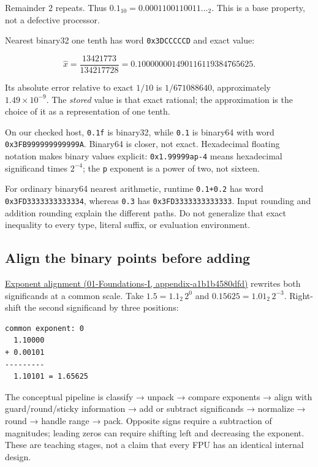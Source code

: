 Remainder 2 repeats. Thus \(0.1_{10}=0.0001100110011\ldots_2\). This is a base property, not a defective processor.

Nearest binary32 one tenth has word \texttt{0x3DCCCCCD} and exact value:

\[
\widehat{x}=\frac{13421773}{134217728}
=0.100000001490116119384765625.
\]

Its absolute error relative to exact \(1/10\) is \(1/671088640\), approximately \(1.49\times10^{-9}\). The \emph{stored} value is that exact rational; the approximation is the choice of it as a representation of one tenth.

On our checked host, \texttt{0.1f} is binary32, while \texttt{0.1} is binary64 with word \texttt{0x3FB999999999999A}. Binary64 is closer, not exact. Hexadecimal floating notation makes binary values explicit: \texttt{0x1.99999ap-4} means hexadecimal significand times \(2^{-4}\); the \texttt{p} exponent is a power of two, not sixteen.

For ordinary binary64 nearest arithmetic, runtime \texttt{0.1+0.2} has word \texttt{0x3FD3333333333334}, whereas \texttt{0.3} has \texttt{0x3FD3333333333333}. Input rounding and addition rounding explain the different paths. Do not generalize that exact inequality to every type, literal suffix, or evaluation environment.

\subsection{Align the binary points before adding}\label{05-engine-i-ch001-align-the-binary-points-before-adding}

\href{../01-Foundations-I/main.pdf\#nameddest=appendix-a1b1b4580dfd}{Exponent alignment (01-Foundations-I, appendix-a1b1b4580dfd)} rewrites both significands at a common scale. Take \(1.5=1.1_2\,2^0\) and \(0.15625=1.01_2\,2^{-3}\). Right-shift the second significand by three positions:

\begin{verbatim}
common exponent: 0
  1.10000
+ 0.00101
---------
  1.10101 = 1.65625
\end{verbatim}

The conceptual pipeline is classify → unpack → compare exponents → align with guard/round/sticky information → add or subtract significands → normalize → round → handle range → pack. Opposite signs require a subtraction of magnitudes; leading zeros can require shifting left and decreasing the exponent. These are teaching stages, not a claim that every FPU has an identical internal design.

